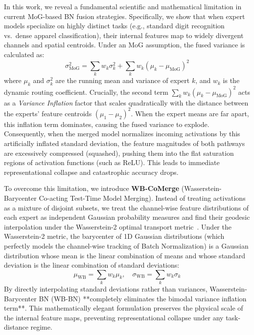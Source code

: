 \documentclass{article}
\theoremstyle{plain}
\theoremstyle{definition}
\theoremstyle{remark}
\begin{document}
In this work, we reveal a fundamental scientific and mathematical limitation in current MoG-based BN fusion strategies. Specifically, we show that when expert models specialize on highly distinct tasks (e.g., standard digit recognition vs.\ dense apparel classification), their internal features map to widely divergent channels and spatial centroids. Under an MoG assumption, the fused variance is calculated as:
\begin{equation}
  \sigma^2_{\text{MoG}} = \sum_k w_k \sigma_k^2 + \sum_k w_k (\mu_k - \mu_{\text{MoG}})^2
\end{equation}
where $\mu_k$ and $\sigma_k^2$ are the running mean and variance of expert $k$, and $w_k$ is the dynamic routing coefficient. Crucially, the second term $\sum_k w_k (\mu_k - \mu_{\text{MoG}})^2$ acts as a \emph{Variance Inflation} factor that scales quadratically with the distance between the experts' feature centroids $(\mu_1 - \mu_2)^2$. When the expert means are far apart, this inflation term dominates, causing the fused variance to explode. Consequently, when the merged model normalizes incoming activations by this artificially inflated standard deviation, the feature magnitudes of both pathways are excessively compressed (squashed), pushing them into the flat saturation regions of activation functions (such as ReLU). This leads to immediate representational collapse and catastrophic accuracy drops.

To overcome this limitation, we introduce \textbf{WB-CoMerge} (Wasserstein-Barycenter Co-acting Test-Time Model Merging). Instead of treating activations as a mixture of disjoint subsets, we treat the channel-wise feature distributions of each expert as independent Gaussian probability measures and find their geodesic interpolation under the Wasserstein-2 optimal transport metric~\cite{agueh2011barycenters,peyre2019computational}. Under the Wasserstein-2 metric, the barycenter of 1D Gaussian distributions (which perfectly models the channel-wise tracking of Batch Normalization) is a Gaussian distribution whose mean is the linear combination of means and whose standard deviation is the linear combination of standard deviations:
\begin{equation}
  \mu_{\text{WB}} = \sum_k w_k \mu_k, \quad \sigma_{\text{WB}} = \sum_k w_k \sigma_k
\end{equation}
By directly interpolating standard deviations rather than variances, Wasserstein-Barycenter BN (WB-BN) **completely eliminates the bimodal variance inflation term**. This mathematically elegant formulation preserves the physical scale of the internal feature maps, preventing representational collapse under any task-distance regime.
\end{document}
